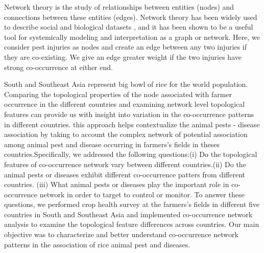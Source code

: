 Network theory is the study of relationships between entities (nodes) and connections between these entities (edges). Network theory has been widely used to describe social and biological datasets \cite{Moslonka_Lefebvre_2011}, and it has been shown to be a useful tool for systemically modeling and  interpretation as a graph or network. Here, we consider pest injuries as nodes and create an edge between any two injuries if they are co-existing. We give an edge greater weight if the two injuries have strong co-occurrence at either end. 

South and Southeast Asia represent big bowl of rice for the world population. Comparing the topological properties of the node associated with farmer occurrence in the different countries and examining network level topological features can provide us with insight into variation in the co-occurrence patterns in different countries. this approach helps contextualize the animal pests - disease association by taking to account the complex network of potential association among animal pest and disease occurring in farmers's fields in theses countries.Specifically, we addressed the following questions:(i) Do the topological features of co-occurrence network vary between different countries.(ii) Do the animal pests or diseases exhibit different co-occurrence patters from different countries. (iii) What animal pests or diseases play the important role in co-occurrence network in order to target to control or monitor. To answer these questions, we performed crop health survey at the farmers's fields in different five countries in South and Southeast Asia and implemented co-occurrence network analysis to examine the topological feature differences  across countries. Our main objective was to characterize and better understand co-occurrence network patterns in the association of rice animal pest and diseases.